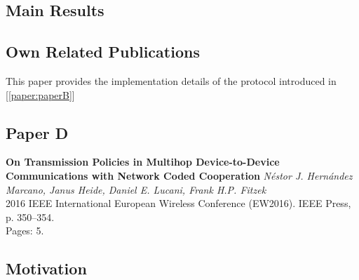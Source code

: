 \subsection*{Main Results}
\subsection*{Own Related Publications}
This paper provides the implementation details of the protocol introduced in [\ref{paper:paperB}]
\clearpage


\subsection{Paper D}
\textbf{On Transmission Policies in Multihop Device-to-Device Communications
with Network Coded Cooperation}
\textit{N\'estor J. Hern\'andez Marcano, Janus Heide, Daniel E. Lucani, Frank H.P. Fitzek}
\\  2016 IEEE International European Wireless Conference (EW2016). IEEE Press, p. 350--354.
\\ Pages: 5.
\subsection*{Motivation}

